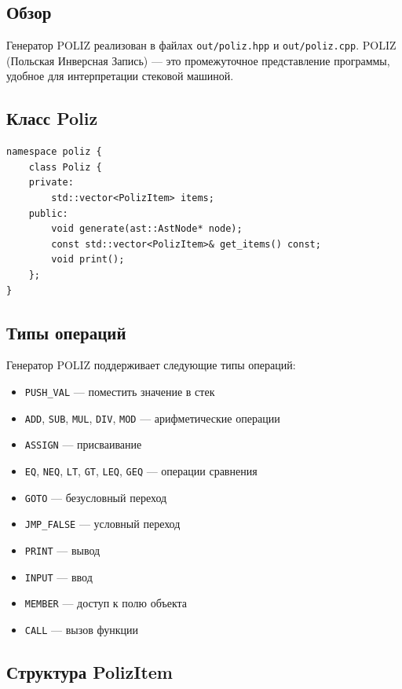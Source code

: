 \documentclass[12pt,a4paper]{article}
\begin{document}
\subsection{Обзор}

Генератор POLIZ реализован в файлах \texttt{out/poliz.hpp} и \texttt{out/poliz.cpp}. POLIZ (Польская Инверсная Запись) --- это промежуточное представление программы, удобное для интерпретации стековой машиной.

\subsection{Класс Poliz}

\begin{lstlisting}
namespace poliz {
    class Poliz {
    private:
        std::vector<PolizItem> items;
    public:
        void generate(ast::AstNode* node);
        const std::vector<PolizItem>& get_items() const;
        void print();
    };
}
\end{lstlisting}

\subsection{Типы операций}

Генератор POLIZ поддерживает следующие типы операций:

\begin{itemize}
    \item \texttt{PUSH\_VAL} --- поместить значение в стек
    \item \texttt{ADD}, \texttt{SUB}, \texttt{MUL}, \texttt{DIV}, \texttt{MOD} --- арифметические операции
    \item \texttt{ASSIGN} --- присваивание
    \item \texttt{EQ}, \texttt{NEQ}, \texttt{LT}, \texttt{GT}, \texttt{LEQ}, \texttt{GEQ} --- операции сравнения
    \item \texttt{GOTO} --- безусловный переход
    \item \texttt{JMP\_FALSE} --- условный переход
    \item \texttt{PRINT} --- вывод
    \item \texttt{INPUT} --- ввод
    \item \texttt{MEMBER} --- доступ к полю объекта
    \item \texttt{CALL} --- вызов функции
\end{itemize}

\subsection{Структура PolizItem}
\end{document}

